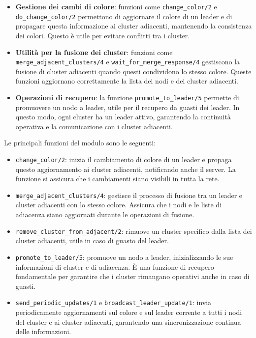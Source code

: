 \documentclass[12pt, a4paper]{report}
\begin{document}
\begin{itemize}
    \item \textbf{Gestione dei cambi di colore}: funzioni come \texttt{change\_color/2} e \texttt{do\_change\_color/2} permettono di aggiornare il colore di un leader e di propagare questa informazione ai cluster adiacenti, mantenendo la consistenza dei colori. Questo è utile per evitare conflitti tra i cluster.

    \item \textbf{Utilità per la fusione dei cluster}: funzioni come \texttt{merge\_adjacent\_clusters/4} e \texttt{wait\_for\_merge\_response/4} gestiscono la fusione di cluster adiacenti quando questi condividono lo stesso colore. Queste funzioni aggiornano correttamente la lista dei nodi e dei cluster adiacenti.

    \item \textbf{Operazioni di recupero}: la funzione \texttt{promote\_to\_leader/5} permette di promuovere un nodo a leader, utile per il recupero da guasti dei leader. In questo modo, ogni cluster ha un leader attivo, garantendo la continuità operativa e la comunicazione con i cluster adiacenti.

\end{itemize}

\noindent
Le principali funzioni del modulo sono le seguenti:

\begin{itemize}
    \item \texttt{change\_color/2}: inizia il cambiamento di colore di un leader e propaga questo aggiornamento ai cluster adiacenti, notificando anche il server. La funzione si assicura che i cambiamenti siano visibili in tutta la rete.

    \item \texttt{merge\_adjacent\_clusters/4}: gestisce il processo di fusione tra un leader e cluster adiacenti con lo stesso colore. Assicura che i nodi e le liste di adiacenza siano aggiornati durante le operazioni di fusione.

    \item \texttt{remove\_cluster\_from\_adjacent/2}: rimuove un cluster specifico dalla lista dei cluster adiacenti, utile in caso di guasto del leader.

    \item \texttt{promote\_to\_leader/5}: promuove un nodo a leader, inizializzando le sue informazioni di cluster e di adiacenza. È una funzione di recupero fondamentale per garantire che i cluster rimangano operativi anche in caso di guasti.

    \item \texttt{send\_periodic\_updates/1} e \texttt{broadcast\_leader\_update/1}: invia periodicamente aggiornamenti sul colore e sul leader corrente a tutti i nodi del cluster e ai cluster adiacenti, garantendo una sincronizzazione continua delle informazioni.

\end{itemize}
\end{document}
